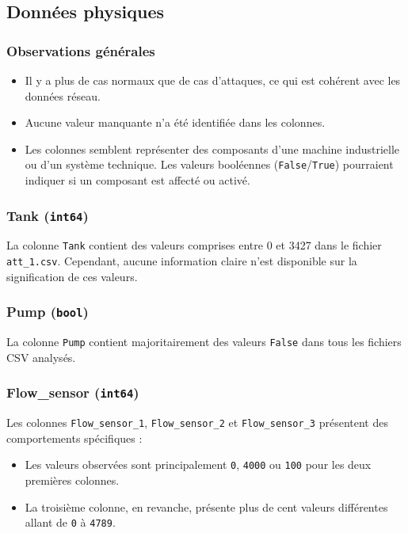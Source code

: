 \subsection{Données physiques}

\subsubsection*{Observations générales}
\begin{itemize}
    \item Il y a plus de cas normaux que de cas d'attaques, ce qui est cohérent avec les données réseau.
    \item Aucune valeur manquante n'a été identifiée dans les colonnes.
    \item Les colonnes semblent représenter des composants d'une machine industrielle ou d'un système technique. Les valeurs booléennes (\texttt{False}/\texttt{True}) pourraient indiquer si un composant est affecté ou activé.
\end{itemize}

\subsubsection*{Tank (\texttt{int64})}
La colonne \texttt{Tank} contient des valeurs comprises entre 0 et 3427 dans le fichier \texttt{att\_1.csv}. Cependant, aucune information claire n'est disponible sur la signification de ces valeurs.

\subsubsection*{Pump (\texttt{bool})}
La colonne \texttt{Pump} contient majoritairement des valeurs \texttt{False} dans tous les fichiers CSV analysés.

\subsubsection*{Flow\_sensor (\texttt{int64})}
Les colonnes \texttt{Flow\_sensor\_1}, \texttt{Flow\_sensor\_2} et \texttt{Flow\_sensor\_3} présentent des comportements spécifiques :
\begin{itemize}
    \item Les valeurs observées sont principalement \texttt{0}, \texttt{4000} ou \texttt{100} pour les deux premières colonnes.
    \item La troisième colonne, en revanche, présente plus de cent valeurs différentes allant de \texttt{0} à \texttt{4789}.
\end{itemize}

